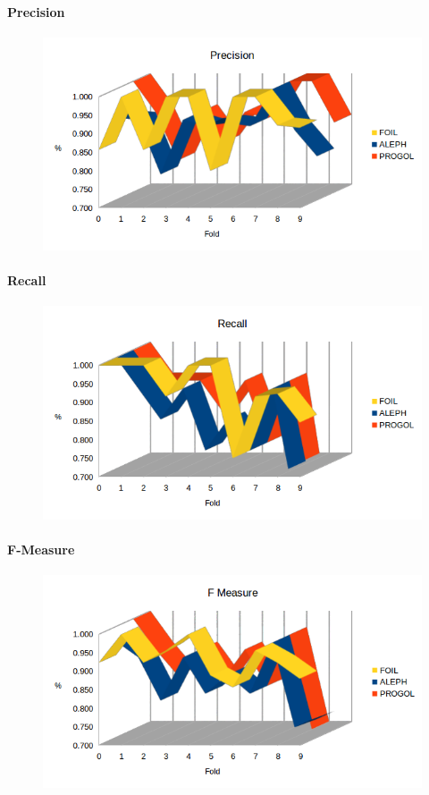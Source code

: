 \paragraph{Precision}
\begin{figure}[h!tbp]
	\includegraphics[width=1.2\textwidth]{img/datasetGraph/mlj/discr/precision.png}
	\label{mljdiscr-Precision}
\end{figure}
\paragraph{Recall}
\begin{figure}[h!tbp]
	\includegraphics[width=1.2\textwidth]{img/datasetGraph/mlj/discr/recall.png}
	\label{mljdiscr-Recall}
\end{figure}
\paragraph{F-Measure}
\begin{figure}[h!tbp]
	\includegraphics[width=1.2\textwidth]{img/datasetGraph/mlj/discr/fm.png}
	\label{mljdiscr-F-measure}
\end{figure}
